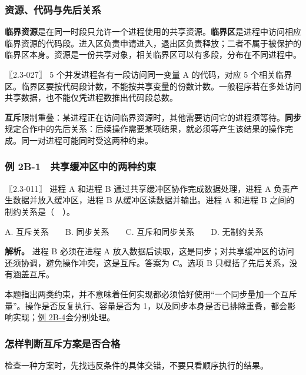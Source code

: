 \subsubsection{资源、代码与先后关系}\label{OS02-auto-7}

\textbf{临界资源}是在同一时段只允许一个进程使用的共享资源。\textbf{临界区}是进程中访问相应临界资源的代码段。进入区负责申请进入，退出区负责释放；二者不属于被保护的临界区本身。资源是一份共享对象，相关临界区可以有多段，分布在不同进程中。

〖2.3-027〗 5 个并发进程各有一段访问同一变量 A 的代码，对应 5 个相关临界区。临界区要按代码段计数，不能按共享变量的份数计数。一般程序若在多处访问共享数据，也不能仅凭进程数推出代码段总数。

\textbf{互斥}限制重叠：某进程正在访问临界资源时，其他需要访问它的进程须等待。\textbf{同步}规定合作中的先后关系：后续操作需要某项结果，就必须等产生该结果的操作完成。同一对进程可能同时受这两种约束。

\subsubsection{例 2B-1　共享缓冲区中的两种约束}\label{OS02-ex-err11}

\begin{example}[配套例题]

〖2.3-011〗 进程 A 和进程 B 通过共享缓冲区协作完成数据处理，进程 A 负责产生数据并放入缓冲区，进程 B 从缓冲区读数据并输出。进程 A 和进程 B 之间的制约关系是（　）。

A. 互斥关系　　B. 同步关系　　C. 互斥和同步关系　　D. 无制约关系

\end{example}

\textbf{解析。} 进程 B 必须在进程 A 放入数据后读取，这是同步；对共享缓冲区的访问还须协调，避免操作冲突，这是互斥。答案为 \textbf{C}。选项 B 只概括了先后关系，没有涵盖互斥。

本题指出两类约束，并不意味着任何实现都必须恰好使用``一个同步量加一个互斥量''。操作是否反复执行、容量是否为 1，以及同步本身是否已排除重叠，都会影响实现；\hyperref[OS02-ex-2024]{例 2B-4}会分别处理。

\subsubsection{怎样判断互斥方案是否合格}\label{OS02-auto-8}

检查一种方案时，先找违反条件的具体交错，不要只看顺序执行的结果。


